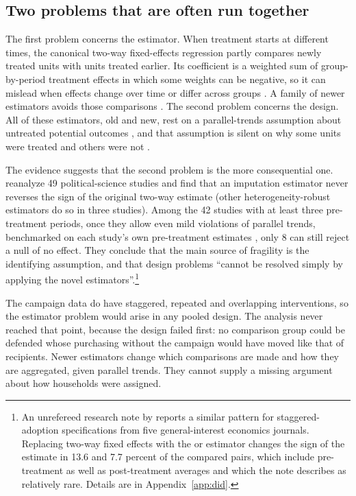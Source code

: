 \documentclass[11pt]{article}
\begin{document}
\subsection{Two problems that are often run together}
\label{sec:design-first}

The first problem concerns the estimator. When treatment starts at different times, the
canonical two-way fixed-effects regression partly compares newly treated units with units
treated earlier. Its coefficient is a weighted sum of group-by-period treatment effects in
which some weights can be negative, so it can mislead when effects change over time or differ
across groups \citep{goodman_bacon,dechaisemartin}. A
family of newer estimators avoids those comparisons
\citep{callaway_santanna,sun_abraham,borusyak}. The second problem concerns the design. All of
these estimators, old and new, rest on a parallel-trends assumption about untreated potential
outcomes \citep{roth_survey}, and that assumption is silent on why some units were treated
and others were not \citep{chiu2026}.

The evidence suggests that the second problem is the more consequential one.
\citet{chiu2026} reanalyze 49 political-science studies and find that an imputation estimator
never reverses the sign of the original two-way estimate (other heterogeneity-robust
estimators do so in three studies). Among the 42 studies with at least three
pre-treatment periods, once they allow even mild violations of parallel trends, benchmarked on each study's own pre-treatment estimates
\citep{rambachan_roth}, only 8 can still reject a null of
no effect. They conclude that the main source of fragility is the identifying assumption, and
that design problems ``cannot be resolved simply by applying the novel
estimators''.\footnote{An unrefereed research note by \citet{hull2026} reports a similar
pattern for staggered-adoption specifications from five general-interest economics journals.
Replacing two-way fixed effects with the \citet{callaway_santanna} or \citet{borusyak}
estimator changes the sign of the estimate in 13.6 and 7.7 percent of the compared pairs, which
include pre-treatment as well as post-treatment averages and which the note describes as
relatively rare. Details are in Appendix~\ref{app:did}.}

The campaign data do have staggered, repeated and overlapping interventions, so the estimator
problem would arise in any pooled design. The analysis never reached that point, because the
design failed first: no comparison group could be defended whose purchasing without the
campaign would have moved like that of recipients. Newer estimators change which comparisons
are made and how they are aggregated, given parallel trends. They cannot supply a missing
argument about how households were assigned.
\end{document}

